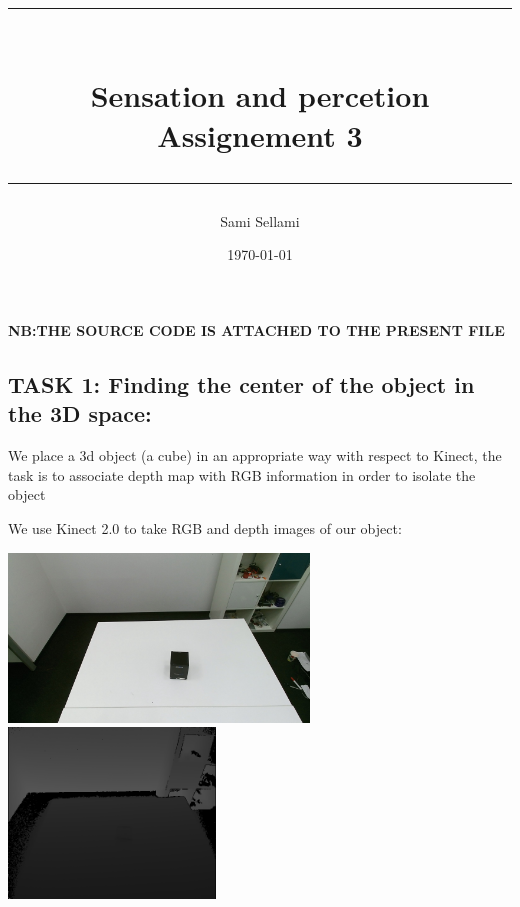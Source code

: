 \documentclass[12pt,a4paper]{report}
\title{
\rule{15cm}{1pt} \\
\Large {\bfseries Sensation and percetion} \\
\Large {\bfseries Assignement 3}\\
\rule{15cm}{1pt}}
\author{Sami Sellami}
\date{\today}
\begin{document}
\setcounter{page}{1}
\setcounter{secnumdepth}{1}
	
\selectfont

\maketitle

\titlelabel{\thetitle)\quad}
\titlespacing{\chapter}{0cm}{0cm}{0cm}
\titlespacing{\section}{0.2cm}{0cm}{0cm}

\textbf{NB:THE SOURCE CODE IS ATTACHED TO THE PRESENT FILE} 


\subsection{TASK 1: Finding the center of the object in the 3D space:}

We place a 3d object (a cube) in an appropriate way with respect to Kinect, the task is to associate depth map with RGB information in order to isolate the object

We use Kinect 2.0 to take RGB and depth images of our object: 
\begin{center}
\includegraphics[width=8cm]{Capture4.jpg}
\includegraphics[width=5.5cm]{Capture5.png}
\end{center}
\end{document}
